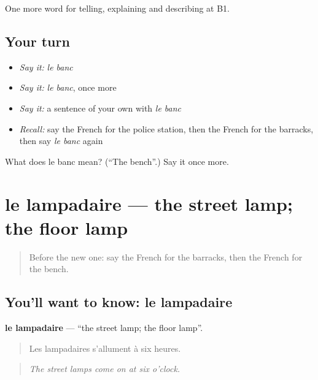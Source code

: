\begin{grammarlens}[title={What you've built}]
One more word for telling, explaining and describing at B1.
\end{grammarlens}

\subsection*{Your turn}
\begin{itemize}
\raggedright
  \item \emph{Say it:} \emph{le banc}
  \item \emph{Say it:} \emph{le banc}, once more
  \item \emph{Say it:} a sentence of your own with \emph{le banc}
  \item \emph{Recall:} say the French for the police station, then the French for the barracks, then say \emph{le banc} again
\end{itemize}

\begin{tcolorbox}[breakable,colback=teal!4,colframe=teal!35!black,title={Before you move on}]
What does le banc mean? (\textquotedblleft{}The bench\textquotedblright{}.) Say it once more.
\end{tcolorbox}
\section[le lampadaire]{le lampadaire — the street lamp; the floor lamp}

\label{lesson:FR-C441-lampadaire}



\begin{quote}
Before the new one: say the French for the barracks, then the French for the bench.
\end{quote}

\subsection*{You'll want to know: le lampadaire}
\textbf{le lampadaire} — \textquotedblleft{}the street lamp; the floor lamp\textquotedblright{}.

\begin{quote}
Les lampadaires s'allument à six heures.
\end{quote}

\begin{quote}
\emph{The street lamps come on at six o'clock.}
\end{quote}


